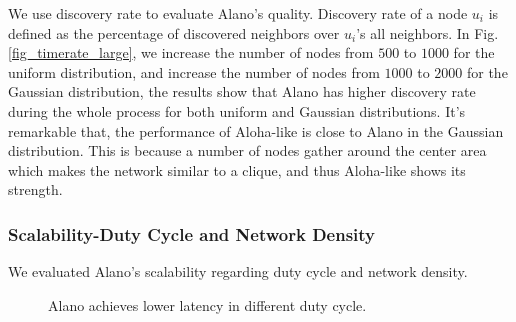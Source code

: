 We use discovery rate to evaluate Alano's quality.
Discovery rate of a node $u_i$ is defined as the percentage of discovered neighbors over $u_i$'s all neighbors.
In Fig. \ref{fig_timerate_large}, we increase the number of nodes from $500$ to $1000$ for the uniform distribution, and increase the number of nodes from $1000$ to $2000$ for the Gaussian distribution, the results show that Alano has higher discovery rate during the whole process for both uniform and Gaussian distributions. It's remarkable that, the performance of Aloha-like is close to Alano in the Gaussian distribution. This is because a number of nodes gather around the center area which makes the network similar to a clique, and thus Aloha-like shows its strength.  





\subsubsection{Scalability-Duty Cycle and Network Density}

We evaluated Alano's scalability regarding duty cycle and network density.

\begin{figure}[!h]
\centering
{}
\hspace{0.01in}
\caption{Alano achieves lower latency in different duty cycle.}
\label{fig_dutycycle}
\end{figure}


